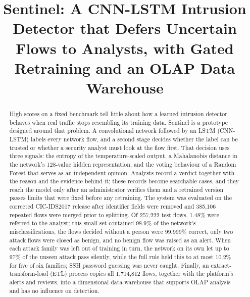 \documentclass[conference]{IEEEtran}
\begin{document}
\title{Sentinel: A CNN-LSTM Intrusion Detector that Defers Uncertain Flows to Analysts, with Gated Retraining and an OLAP Data Warehouse}

\author{
\and
{}
}

\maketitle

\begin{abstract}
High scores on a fixed benchmark tell little about how a learned intrusion detector behaves when
real traffic stops resembling its training data. Sentinel is a prototype designed around that
problem. A convolutional network followed by an LSTM (CNN-LSTM) labels every network flow, and a
second stage decides whether the label can be trusted or whether a security analyst must look at
the flow first. That decision uses three signals: the entropy of the temperature-scaled output, a
Mahalanobis distance in the network's 128-value hidden representation, and the voting behaviour of
a Random Forest that serves as an independent opinion. Analysts record a verdict together with the
reason and the evidence behind it; these records become searchable cases, and they reach the model
only after an administrator verifies them and a retrained version passes limits that were fixed
before any retraining. The system was evaluated on the corrected CIC-IDS2017 release after
identifier fields were removed and 385,106 repeated flows were merged prior to splitting. Of
257,222 test flows, 1.48\% were referred to the analyst; this small set contained 98.9\% of the
network's misclassifications, the flows decided without a person were 99.999\% correct, only two
attack flows were closed as benign, and no benign flow was raised as an alert. When each attack
family was left out of training in turn, the network on its own let up to 97\% of the unseen
attack pass silently, while the full rule held this to at most 10.2\% for five of six families; SSH
password guessing was never caught. Finally, an extract-transform-load (ETL) process copies all
1,714,812 flows, together with the platform's alerts and reviews, into a dimensional data warehouse
that supports OLAP analysis and has no influence on detection.
\end{abstract}
\end{document}

